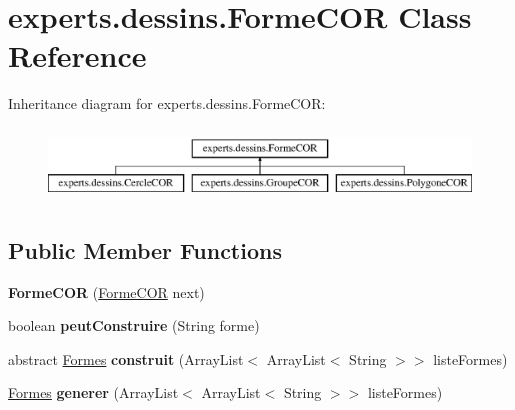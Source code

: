 \hypertarget{classexperts_1_1dessins_1_1_forme_c_o_r}{}\section{experts.\+dessins.\+Forme\+C\+OR Class Reference}
\label{classexperts_1_1dessins_1_1_forme_c_o_r}
Inheritance diagram for experts.\+dessins.\+Forme\+C\+OR\+:\begin{figure}[H]
\begin{center}
\leavevmode
\includegraphics[height=1.954625cm]{db/df0/classexperts_1_1dessins_1_1_forme_c_o_r}
\end{center}
\end{figure}
\subsection*{Public Member Functions}
\begin{DoxyCompactItemize}
\item 
\mbox{\label{classexperts_1_1dessins_1_1_forme_c_o_r_a14ae3b0f1e7398e32311ea4455d68c4e}} 
{\bfseries Forme\+C\+OR} (\mbox{\hyperlink{classexperts_1_1dessins_1_1_forme_c_o_r}{Forme\+C\+OR}} next)
\item 
\mbox{\label{classexperts_1_1dessins_1_1_forme_c_o_r_ae4836b29bd45bf4b7e2174dd294e7512}} 
boolean {\bfseries peut\+Construire} (String forme)
\item 
\mbox{\label{classexperts_1_1dessins_1_1_forme_c_o_r_aa864524ad878956a1c80cac5fd7e82a0}} 
abstract \mbox{\hyperlink{classdessin_1_1_formes}{Formes}} {\bfseries construit} (Array\+List$<$ Array\+List$<$ String $>$$>$ liste\+Formes)
\item 
\mbox{\label{classexperts_1_1dessins_1_1_forme_c_o_r_ae271adecde3174d4ac1df75f99515a0c}} 
\mbox{\hyperlink{classdessin_1_1_formes}{Formes}} {\bfseries generer} (Array\+List$<$ Array\+List$<$ String $>$$>$ liste\+Formes)
\end{DoxyCompactItemize}
